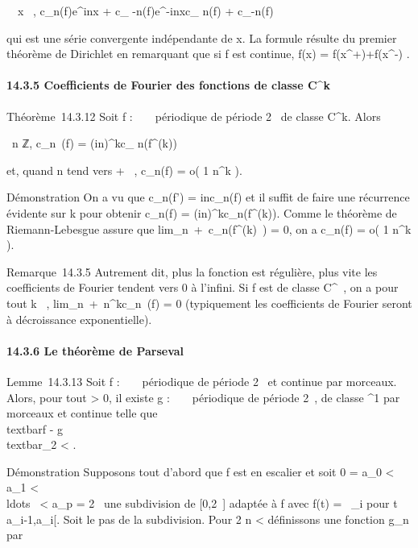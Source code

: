 \documentclass[]{article}
\begin{document}
\forall~~x \in {}~,
\textbar{}c\_n(f)e^inx + c\_
-n(f)e^-inx\textbar{}\leq\textbar{}c\_ n(f)\textbar{}
+ \textbar{}c\_-n(f)\textbar{}

qui est une série convergente indépendante de x. La formule résulte du
premier théorème de Dirichlet en remarquant que si f est continue, f(x)
= f(x^+)+f(x^-)  .

\paragraph{14.3.5 Coefficients de Fourier des fonctions de classe
C^k}

Théorème~14.3.12 Soit f : ~ \rightarrow~  périodique de période 2\pi~ de classe
C^k. Alors

\forall~n \in ℤ, c\_n~(f) =
(in)^kc\_ n(f^(k))

et, quand \textbar{}n\textbar{} tend vers + \infty~, c\_n(f) = o( 1
\over n^k ).

Démonstration On a vu que c\_n(f') = inc\_n(f) et il
suffit de faire une récurrence évidente sur k pour obtenir
c\_n(f) = (in)^kc\_n(f^(k)). Comme
le théorème de Riemann-Lebesgue assure que
lim\_\textbar{}n\textbar{}\rightarrow~+\infty~c\_n(f^(k)~)
= 0, on a c\_n(f) = o( 1 \over n^k
).

Remarque~14.3.5 Autrement dit, plus la fonction est régulière, plus vite
les coefficients de Fourier tendent vers 0 à l'infini. Si f est de
classe C^\infty~, on a pour tout k \in {}~,
lim\_\textbar{}n\textbar{}\rightarrow~+\infty~n^kc\_n~(f)
= 0 (typiquement les coefficients de Fourier seront à décroissance
exponentielle).

\paragraph{14.3.6 Le théorème de Parseval}

Lemme~14.3.13 Soit f : ~ \rightarrow~  périodique de période 2\pi~ et continue par
morceaux. Alors, pour tout \epsilon \textgreater{} 0, il existe g : ~ \rightarrow~ 
périodique de période 2\pi~, de classe ^1 par morceaux et
continue telle que \\textbar{}f -
g\\textbar{}\_2 \textless{} \epsilon.

Démonstration Supposons tout d'abord que f est en escalier et soit 0 =
a\_0 \textless{} a\_1 \textless{}
\\ldots~ \textless{}
a\_p = 2\pi~ une subdivision de {[}0,2\pi~{]} adaptée à f avec f(t) =
\lambda~\_i pour t \in{]}a\_i-1,a\_i{[}. Soit \delta le pas de
la subdivision. Pour  2 \over n \textless{} \eta
définissons une fonction g\_n par
\end{document}
